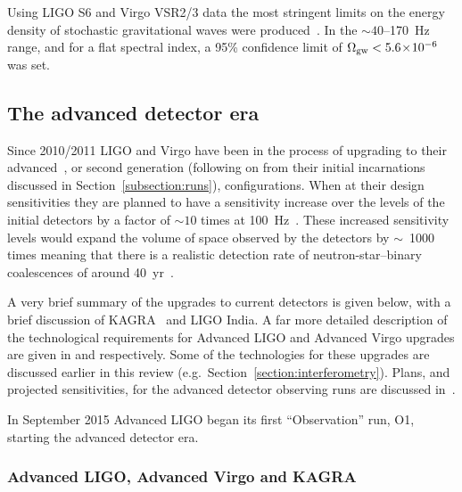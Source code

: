 Using LIGO S6 and Virgo VSR2/3 data the most stringent limits on the energy density
of stochastic gravitational waves were produced~\cite{2014PhRvL.113w1101A}. In the $\sim 40$--170~Hz
range, and for a flat spectral index, a 95\% confidence limit of $\Omega_{\rm gw} < 5.6\!\times\!10^{-6}$
was set.

\subsection{The advanced detector era}

Since 2010/2011 LIGO and Virgo have been in the process of upgrading to their advanced~\cite{2015CQGra..32g4001L,
Harry:2010, AdvLIGO, AdvLIGOweb, 2015CQGra..32b4001A, AdvVirgoDesign, AdvVirgoweb}, or second generation
(following on from their initial incarnations discussed in Section~\ref{subsection:runs}), configurations.
When at their design sensitivities they are planned to have a sensitivity increase over the levels of
the initial detectors by a factor of $\sim10$ times at 100~Hz~\cite{lrr-2016-1}. These increased sensitivity
levels would expand the volume of space observed by the detectors by $\sim$~1000
times meaning that there is a realistic detection rate of neutron-star--binary
coalescences of around 40~yr~\cite{Abadie:2010e, Kopparapu:2008}.

A very brief summary of the upgrades to current detectors is given below, with a brief discussion of
KAGRA~\cite{2013PhRvD..88d3007A} and LIGO India. A far more detailed description of the technological requirements for
Advanced LIGO and Advanced Virgo upgrades are given in \cite{2015CQGra..32g4001L} and \cite{2015CQGra..32b4001A} respectively.
Some of the technologies for these upgrades are discussed earlier in this review (e.g.\, Section~\ref{section:interferometry}).
Plans, and projected sensitivities, for the advanced detector observing runs are discussed in~\cite{lrr-2016-1}.

In September 2015 Advanced LIGO began its first ``Observation'' run, O1, starting the advanced detector era.

\subsubsection{Advanced LIGO, Advanced Virgo and KAGRA}
\label{subsection:aligo} 

